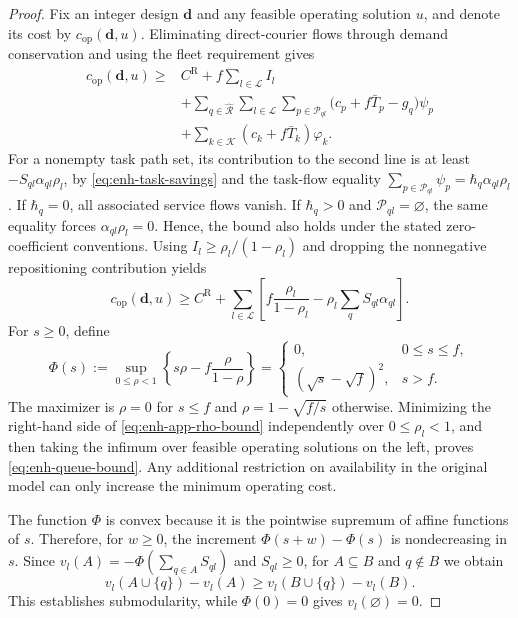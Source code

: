 \begin{proof}
Fix an integer design $\boldsymbol d$ and any feasible operating solution $u$, and denote its cost by $c_{\mathrm{op}}(\boldsymbol d,u)$.
Eliminating direct-courier flows through demand conservation and using the fleet requirement gives
\begin{equation}
    \begin{aligned}
    c_{\mathrm{op}}(\boldsymbol d,u)
    \ge {}& C^{\mathrm R}+f\sum_{l\in\mathcal L}I_l\\
    &+\sum_{q\in\hat{\mathcal R}}\sum_{l\in\mathcal L}
      \sum_{p\in\mathcal P_{ql}}
      \bigl(c_p+f\bar T_p-g_q\bigr)\psi_p\\
    &+\sum_{k\in\mathcal K}(c_k+f\bar T_k)\varphi_k.
    \end{aligned}
    \label{eq:enh-app-cost}
\end{equation}
For a nonempty task path set, its contribution to the second line is at least $-S_{ql}\alpha_{ql}\rho_l$, by \eqref{eq:enh-task-savings} and the task-flow equality $\sum_{p\in\mathcal P_{ql}}\psi_p=\hbar_q\alpha_{ql}\rho_l$.
If $\hbar_q=0$, all associated service flows vanish.
If $\hbar_q>0$ and $\mathcal P_{ql}=\varnothing$, the same equality forces $\alpha_{ql}\rho_l=0$.
Hence, the bound also holds under the stated zero-coefficient conventions.
Using $I_l\ge\rho_l/(1-\rho_l)$ and dropping the nonnegative repositioning contribution yields
\begin{equation}
    c_{\mathrm{op}}(\boldsymbol d,u)
    \ge C^{\mathrm R}+\sum_{l\in\mathcal L}
    \left[f\frac{\rho_l}{1-\rho_l}
    -\rho_l\sum_q S_{ql}\alpha_{ql}\right].
    \label{eq:enh-app-rho-bound}
\end{equation}
For $s\ge0$, define
\begin{equation}
    \Phi(s)
    :=\sup_{0\le\rho<1}\left\{s\rho-f\frac{\rho}{1-\rho}\right\}
    =\begin{cases}
      0,&0\le s\le f,\\
      (\sqrt{s}-\sqrt f)^2,&s>f.
    \end{cases}
    \label{eq:enh-app-phi}
\end{equation}
The maximizer is $\rho=0$ for $s\le f$ and $\rho=1-\sqrt{f/s}$ otherwise.
Minimizing the right-hand side of \eqref{eq:enh-app-rho-bound} independently over $0\le\rho_l<1$, and then taking the infimum over feasible operating solutions on the left, proves \eqref{eq:enh-queue-bound}.
Any additional restriction on availability in the original model can only increase the minimum operating cost.

The function $\Phi$ is convex because it is the pointwise supremum of affine functions of $s$.
Therefore, for $w\ge0$, the increment $\Phi(s+w)-\Phi(s)$ is nondecreasing in $s$.
Since $v_l(A)=-\Phi(\sum_{q\in A}S_{ql})$ and $S_{ql}\ge0$, for $A\subseteq B$ and $q\notin B$ we obtain
\begin{equation}
    v_l(A\cup\{q\})-v_l(A)
    \ge v_l(B\cup\{q\})-v_l(B).
    \label{eq:enh-app-submodular}
\end{equation}
This establishes submodularity, while $\Phi(0)=0$ gives $v_l(\varnothing)=0$.
\end{proof}


